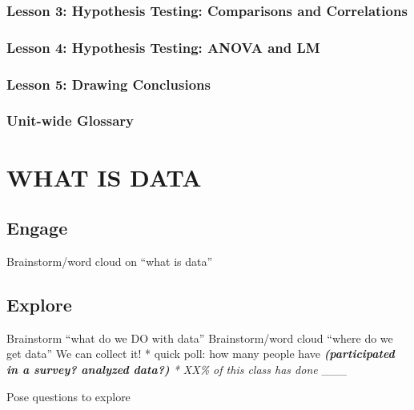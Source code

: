 \documentclass[
]{book}
\begin{document}
\hypertarget{lesson-3-hypothesis-testing-comparisons-and-correlations}{%
\subsection*{Lesson 3: Hypothesis Testing: Comparisons and Correlations}\label{lesson-3-hypothesis-testing-comparisons-and-correlations}}

\hypertarget{lesson-4-hypothesis-testing-anova-and-lm}{%
\subsection*{Lesson 4: Hypothesis Testing: ANOVA and LM}\label{lesson-4-hypothesis-testing-anova-and-lm}}

\hypertarget{lesson-5-drawing-conclusions}{%
\subsection*{Lesson 5: Drawing Conclusions}\label{lesson-5-drawing-conclusions}}

\hypertarget{unit-wide-glossary}{%
\subsection*{Unit-wide Glossary}\label{unit-wide-glossary}}

\hypertarget{unit1_ch1}{%
\chapter{WHAT IS DATA}\label{unit1_ch1}}

\hypertarget{engage}{%
\section{Engage}\label{engage}}

Brainstorm/word cloud on ``what is data''

\hypertarget{explore}{%
\section{Explore}\label{explore}}

Brainstorm ``what do we DO with data''
Brainstorm/word cloud ``where do we get data''
We can collect it!
* quick poll: how many people have \emph{\textbf{(participated in a survey? analyzed data?)}
* XX\% of this class has done }\_\_\_

Pose questions to explore
\end{document}
